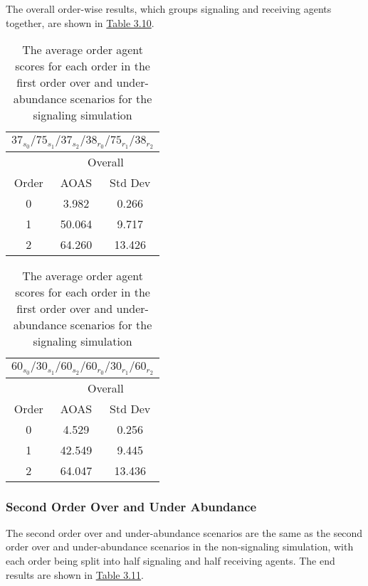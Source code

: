 The overall order-wise results, which groups signaling and receiving agents together, are shown in \hyperref[table:sig-first-order-overall]{Table 3.10}.

\begin{table}[h]
    \centering
    \begin{tabular}{|c|c|c|}
        \hline
        \multicolumn{3}{|c|}{$37_{s_{0}}/75_{s_{1}}/37_{s_{2}}/38_{r_{0}}/75_{r_{1}}/38_{r_{2}}$} \\
        \hline
        \multicolumn{1}{|c|}{} & \multicolumn{2}{|c|}{Overall} \\
        \hline
        Order & AOAS & Std Dev \\
        \hline
        0     & 3.982   & 0.266    \\
        1     & 50.064  & 9.717   \\
        2     & 64.260  & 13.426   \\
        \hline
    \end{tabular}
    \qquad
    \begin{tabular}{|c|c|c|}
        \hline
        \multicolumn{3}{|c|}{$60_{s_{0}}/30_{s_{1}}/60_{s_{2}}/60_{r_{0}}/30_{r_{1}}/60_{r_{2}}$} \\
        \hline
        \multicolumn{1}{|c|}{} & \multicolumn{2}{|c|}{Overall} \\
        \hline
        Order & AOAS & Std Dev \\
        \hline
        0     & 4.529   & 0.256    \\
        1     & 42.549  & 9.445   \\
        2     & 64.047  & 13.436   \\
        \hline
    \end{tabular}
    \caption{The average order agent scores for each order in the first order over and under-abundance scenarios for the signaling simulation}
    \label{table:sig-first-order-overall}
\end{table}

\subsubsection{Second Order Over and Under Abundance}

The second order over and under-abundance scenarios are the same as the second order over and under-abundance scenarios in the non-signaling simulation, with each order being split into half signaling and half receiving agents. The end results are shown in \hyperref[table:sig-second-order-simple]{Table 3.11}.

